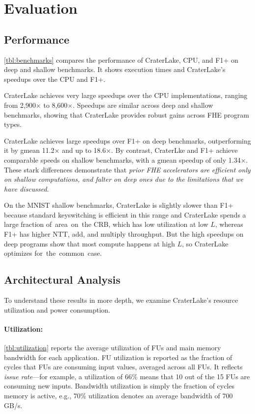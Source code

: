 \section{Evaluation}\label{sec:results}

\subsection{Performance}

\autoref{tbl:benchmarks} compares the performance of CraterLake, CPU, and F1+
on deep and shallow benchmarks. It shows execution times and CraterLake's
speedups over the CPU and F1+.

CraterLake achieves very large speedups over the CPU implementations, ranging
from 2,900$\times$ to 8,600$\times$. Speedups are similar across deep and
shallow benchmarks, showing that CraterLake provides robust gains across FHE
program types.

CraterLake achieves large speedups over F1+ on deep benchmarks, outperforming
it by gmean 11.2$\times$ and up to 18.6$\times$. By contrast, CraterLke and F1+
achieve comparable speeds on shallow benchmarks, with a gmean speedup of only
1.34$\times$. These stark differences demonstrate that \emph{prior FHE
accelerators are efficient only on shallow computations, and falter on deep
ones due to the limitations that we have discussed}.

On the MNIST shallow benchmarks, CraterLake is slightly slower than F1+ because
standard keyswitching is efficient in this range and CraterLake spends a large
fraction of~area~on~the CRB, which has low utilization at low $L$, whereas F1+
has higher NTT, add, and multiply throughput. But the high speedups on deep
programs show that most compute happens at high $L$, so CraterLake optimizes
for~the~common~case.

\subsection{Architectural Analysis}\label{sec:architecturalAnalysis}

To understand these results in more depth, we examine CraterLake's resource
utilization and power consumption.

\tblUtilization

\paragraph{Utilization:}
\autoref{tbl:utilization} reports the average utilization of FUs and main
memory bandwidth for each application. FU utilization is reported as the
fraction of cycles that FUs are consuming input values, averaged across all
FUs. It reflects \emph{issue rate}---for example, a utilization of 66\% means
that 10 out of the 15 FUs are consuming new inputs. Bandwidth utilization is
simply the fraction of cycles memory is active, e.g., 70\% utilization denotes
an average bandwidth of 700\,GB/s.

